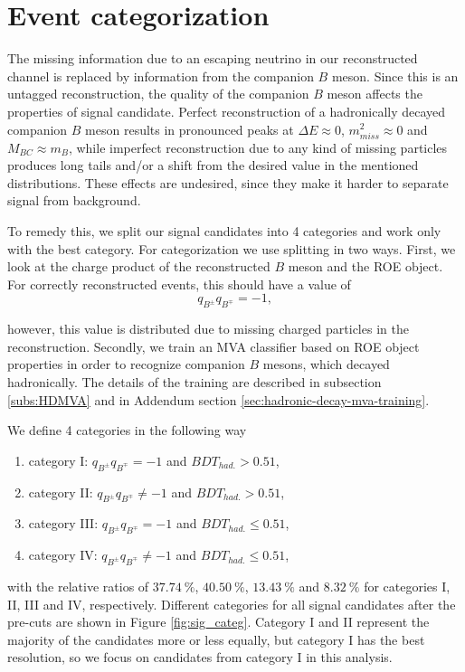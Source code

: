 \section{Event categorization}\label{sec:event-categorization}

The missing information due to an escaping neutrino in our reconstructed channel is replaced by information from the companion $B$ meson. Since this is an untagged reconstruction, the quality of the companion $B$ meson affects the properties of signal candidate. Perfect reconstruction of a hadronically decayed companion $B$ meson results in pronounced peaks at $\Delta E \approx 0$, $m_{miss}^2 \approx 0$ and $M_{BC} \approx m_B$, while imperfect reconstruction due to any kind of missing particles produces long tails and/or a shift from the desired value in the mentioned distributions. These effects are undesired, since they make it harder to separate signal from background.

To remedy this, we split our signal candidates into 4 categories and work only with the best category. For categorization we use splitting in two ways. First, we look at the charge product of the reconstructed $B$ meson and the ROE object. For correctly reconstructed events, this should have a value of 
\begin{equation}
\label{eq:chargeprod}
q_{B^\pm}q_{B^\mp} = -1,
\end{equation}

however, this value is distributed due to missing charged particles in the reconstruction. Secondly, we train an MVA classifier based on ROE object properties in order to recognize companion $B$ mesons, which decayed hadronically. The details of the training are described in subsection \ref{subs:HDMVA} and in Addendum section \ref{sec:hadronic-decay-mva-training}.

We define 4 categories in the following way
\begin{enumerate} 
\item[]category I: $q_{B^\pm}q_{B^\mp} = -1$ and $BDT_{had.} > 0.51$,
\item[]category II: $q_{B^\pm}q_{B^\mp} \neq -1$ and $BDT_{had.} > 0.51$,
\item[]category III: $q_{B^\pm}q_{B^\mp} = -1$ and $BDT_{had.} \leq 0.51$,
\item[]category IV: $q_{B^\pm}q_{B^\mp} \neq -1$ and $BDT_{had.} \leq 0.51$,
\end{enumerate}

with the relative ratios of $37.74~\%$, $40.50~\%$, $13.43~\%$ and $8.32~\%$ for categories I, II, III and IV, respectively. Different categories for all signal candidates after the pre-cuts are shown in Figure \ref{fig:sig_categ}. Category I and II represent the majority of the candidates more or less equally, but category I has the best resolution, so we focus on candidates from category I in this analysis.

